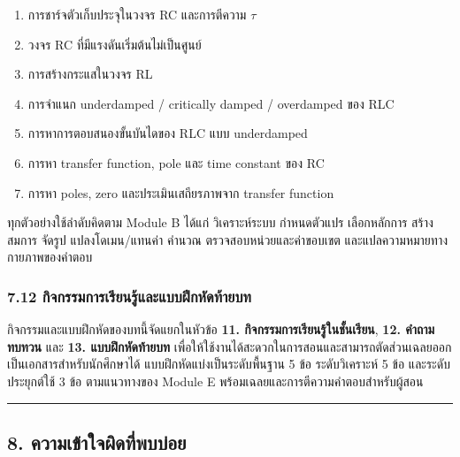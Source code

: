 \begin{enumerate}
    \item การชาร์จตัวเก็บประจุในวงจร RC และการตีความ $\tau$
    \item วงจร RC ที่มีแรงดันเริ่มต้นไม่เป็นศูนย์
    \item การสร้างกระแสในวงจร RL
    \item การจำแนก underdamped / critically damped / overdamped ของ RLC
    \item การหาการตอบสนองขั้นบันไดของ RLC แบบ underdamped
    \item การหา transfer function, pole และ time constant ของ RC
    \item การหา poles, zero และประเมินเสถียรภาพจาก transfer function
\end{enumerate}

ทุกตัวอย่างใช้ลำดับคิดตาม Module B ได้แก่ วิเคราะห์ระบบ กำหนดตัวแปร เลือกหลักการ สร้างสมการ จัดรูป แปลงโดเมน/แทนค่า คำนวณ ตรวจสอบหน่วยและค่าขอบเขต และแปลความหมายทางกายภาพของคำตอบ

\subsubsection{7.12 กิจกรรมการเรียนรู้และแบบฝึกหัดท้ายบท}

กิจกรรมและแบบฝึกหัดของบทนี้จัดแยกในหัวข้อ \textbf{11. กิจกรรมการเรียนรู้ในชั้นเรียน}, \textbf{12. คำถามทบทวน} และ \textbf{13. แบบฝึกหัดท้ายบท} เพื่อให้ใช้งานได้สะดวกในการสอนและสามารถตัดส่วนเฉลยออกเป็นเอกสารสำหรับนักศึกษาได้ แบบฝึกหัดแบ่งเป็นระดับพื้นฐาน 5 ข้อ ระดับวิเคราะห์ 5 ข้อ และระดับประยุกต์ใช้ 3 ข้อ ตามแนวทางของ Module E พร้อมเฉลยและการตีความคำตอบสำหรับผู้สอน

\par\noindent\rule{\textwidth}{0.4pt}\par

\subsection{8. ความเข้าใจผิดที่พบบ่อย}

